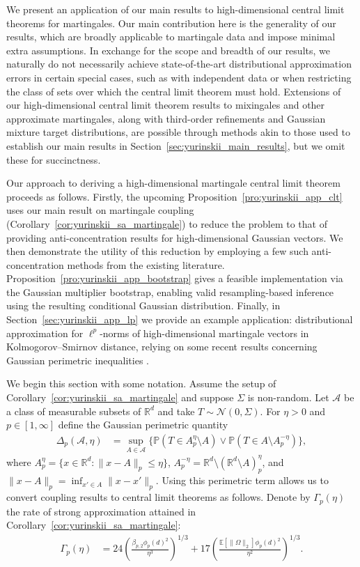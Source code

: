 \documentclass[11pt,lof]{puthesis}
\renewcommand{\P}{\ensuremath{\mathbb{P}}}
\newcommand{\R}{\ensuremath{\mathbb{R}}}
\newcommand{\E}{\ensuremath{\mathbb{E}}}
\newcommand{\cN}{\ensuremath{\mathcal{N}}}
\newcommand{\cA}{\ensuremath{\mathcal{A}}}
\theoremstyle{break}
\theoremstyle{proof}
\begin{document}
We present an application of our main results to
high-dimensional central limit theorems for martingales. Our main
contribution here is the generality of our results, which are broadly
applicable to martingale data and impose minimal extra assumptions. In exchange
for the scope and breadth of our results, we naturally do not necessarily
achieve state-of-the-art distributional approximation errors in certain special
cases, such as with independent data or when restricting the class of sets over
which the central limit theorem must hold. Extensions of our high-dimensional
central limit theorem results to mixingales and other approximate martingales,
along with third-order refinements and Gaussian mixture target distributions,
are possible through methods akin to those used to establish our main results
in Section~\ref{sec:yurinskii_main_results}, but we omit these for succinctness.

Our approach to deriving a high-dimensional martingale central limit theorem
proceeds as follows. Firstly, the upcoming
Proposition~\ref{pro:yurinskii_app_clt} uses our
main result on martingale coupling
(Corollary~\ref{cor:yurinskii_sa_martingale}) to
reduce the problem to that of providing anti-concentration results for
high-dimensional Gaussian vectors. We then demonstrate the utility of this
reduction by employing a few such anti-concentration methods from the existing
literature. Proposition~\ref{pro:yurinskii_app_bootstrap} gives a feasible
implementation via
the Gaussian multiplier bootstrap, enabling valid
resampling-based inference using
the resulting conditional Gaussian distribution. Finally, in
Section~\ref{sec:yurinskii_app_lp} we provide an example application:
distributional approximation for $\ell^p$-norms of high-dimensional martingale
vectors in Kolmogorov--Smirnov distance, relying on some recent results
concerning Gaussian perimetric inequalities
\citep{nazarov2003maximal,kozbur2021dimension,
giessing2023anti,chernozhukov2017detailed}.

We begin this section with some notation. Assume the setup of
Corollary~\ref{cor:yurinskii_sa_martingale} and suppose $\Sigma$ is
non-random. Let $\cA$ be a class of measurable subsets of
$\R^d$ and take $T \sim \cN(0, \Sigma)$.
For $\eta>0$ and $p \in [1, \infty]$ define the Gaussian perimetric quantity
%
\begin{align*}
  \Delta_p(\cA, \eta)
  &=
  \sup_{A\in \cA}
  \big\{\P(T\in A_p^\eta\setminus A)
  \vee \P(T\in A \setminus A_p^{-\eta})\big\},
\end{align*}
%
where $A_p^\eta = \{x \in \R^d : \|x - A\|_p \leq \eta\}$,
$A_p^{-\eta} = \R^d \setminus (\R^d \setminus A)_p^\eta$,
and $\|x - A\|_p = \inf_{x' \in A} \|x - x'\|_p$.
Using this perimetric term allows us to convert coupling results
to central limit theorems as follows.
Denote by $\Gamma_p(\eta)$ the rate of strong approximation attained in
Corollary~\ref{cor:yurinskii_sa_martingale}:
%
\begin{align*}
  \Gamma_p(\eta)
  &=
  24 \left(
    \frac{\beta_{p,2} \phi_p(d)^2}{\eta^3}
  \right)^{1/3}
  + 17 \left(
    \frac{\E \left[ \|\Omega\|_2 \right] \phi_p(d)^2}{\eta^2}
  \right)^{1/3}.
\end{align*}
\end{document}
